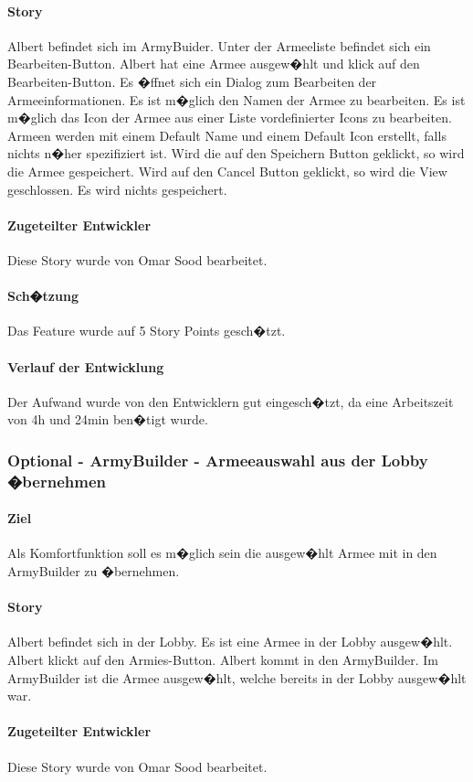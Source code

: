 \documentclass[12pt, titlepage]{scrartcl}
\begin{document}
			\paragraph{Story}Albert befindet sich im ArmyBuider. Unter der Armeeliste befindet sich ein Bearbeiten-Button. Albert hat eine Armee ausgew�hlt und klick auf den Bearbeiten-Button. Es �ffnet sich ein Dialog zum Bearbeiten der Armeeinformationen. Es ist m�glich den Namen der Armee zu bearbeiten. Es ist m�glich das Icon der Armee aus einer Liste vordefinierter Icons zu bearbeiten. Armeen werden mit einem Default Name und einem Default Icon erstellt, falls nichts n�her spezifiziert ist. Wird die auf den Speichern Button geklickt, so wird die Armee gespeichert. Wird auf den Cancel Button geklickt, so wird die View geschlossen. Es wird nichts gespeichert.
			\paragraph{Zugeteilter Entwickler} Diese Story wurde von Omar Sood bearbeitet.
			\paragraph{Sch�tzung}
			Das Feature wurde auf 5 Story Points gesch�tzt.
			\paragraph{Verlauf der Entwicklung} 
			Der Aufwand wurde von den Entwicklern gut eingesch�tzt, da eine Arbeitszeit von 4h und 24min ben�tigt wurde.
		
			\subsubsection{Optional - ArmyBuilder - Armeeauswahl aus der Lobby �bernehmen}
			\paragraph{Ziel} Als Komfortfunktion soll es m�glich sein die ausgew�hlt Armee mit in den ArmyBuilder zu �bernehmen.
			\paragraph{Story} Albert befindet sich in der Lobby. Es ist eine Armee in der Lobby ausgew�hlt. Albert klickt auf den Armies-Button. Albert kommt in den ArmyBuilder. Im ArmyBuilder ist die Armee ausgew�hlt, welche bereits in der Lobby ausgew�hlt war.
			\paragraph{Zugeteilter Entwickler} Diese Story wurde von Omar Sood bearbeitet.
\end{document}
